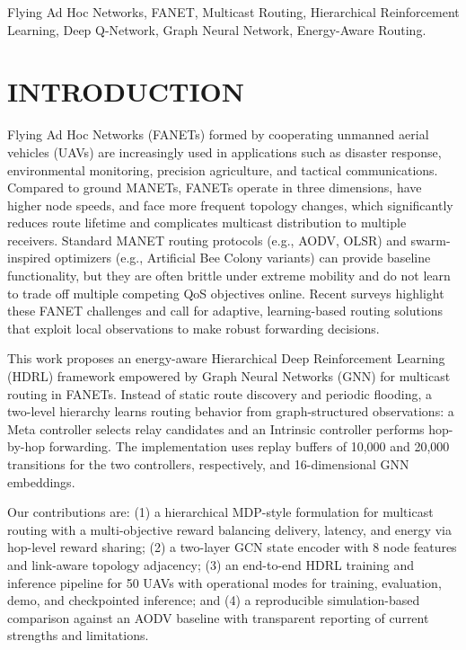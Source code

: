 \documentclass[conference]{IEEEtran}
\begin{document}
\begin{IEEEkeywords}
Flying Ad Hoc Networks, FANET, Multicast Routing, Hierarchical Reinforcement Learning, Deep Q-Network, Graph Neural Network, Energy-Aware Routing.
\end{IEEEkeywords}

\section{INTRODUCTION}
Flying Ad Hoc Networks (FANETs) formed by cooperating unmanned aerial vehicles (UAVs) are increasingly used in applications such as disaster response, environmental monitoring, precision agriculture, and tactical communications. Compared to ground MANETs, FANETs operate in three dimensions, have higher node speeds, and face more frequent topology changes, which significantly reduces route lifetime and complicates multicast distribution to multiple receivers. Standard MANET routing protocols (e.g., AODV, OLSR) and swarm-inspired optimizers (e.g., Artificial Bee Colony variants) can provide baseline functionality, but they are often brittle under extreme mobility and do not learn to trade off multiple competing QoS objectives online. Recent surveys highlight these FANET challenges and call for adaptive, learning-based routing solutions that exploit local observations to make robust forwarding decisions.

This work proposes an energy-aware Hierarchical Deep Reinforcement Learning (HDRL) framework empowered by Graph Neural Networks (GNN) for multicast routing in FANETs. Instead of static route discovery and periodic flooding, a two-level hierarchy learns routing behavior from graph-structured observations: a Meta controller selects relay candidates and an Intrinsic controller performs hop-by-hop forwarding. The implementation uses replay buffers of 10,000 and 20,000 transitions for the two controllers, respectively, and 16-dimensional GNN embeddings.

Our contributions are: (1) a hierarchical MDP-style formulation for multicast routing with a multi-objective reward balancing delivery, latency, and energy via hop-level reward sharing; (2) a two-layer GCN state encoder with 8 node features and link-aware topology adjacency; (3) an end-to-end HDRL training and inference pipeline for 50 UAVs with operational modes for training, evaluation, demo, and checkpointed inference; and (4) a reproducible simulation-based comparison against an AODV baseline with transparent reporting of current strengths and limitations.
\end{document}
